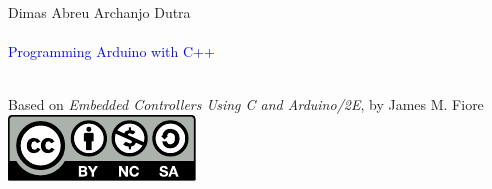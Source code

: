 \begin{titlingpage}
  \begingroup
  \raggedleft
  \vspace*{\baselineskip}
  {\Large Dimas Abreu Archanjo Dutra}\\[0.167\textheight]
  {\bfseries ~}\\[\baselineskip]
  {\textcolor{Blue}{\Huge Programming Arduino with C++}}\\[\baselineskip]
  {\small ~}\par
  \vfill
  {Based on \emph{Embedded Controllers Using C and Arduino/2E}, by James M. Fiore
    \\ \includegraphics{img/cc-by-nc-sa.pdf}}\par
  \vspace*{3\baselineskip}
  \endgroup
\end{titlingpage}